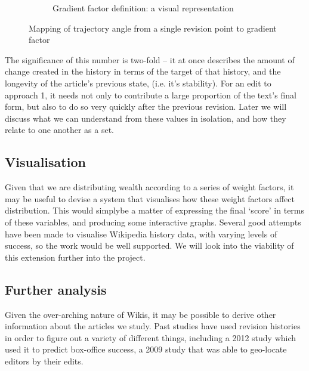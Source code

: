 \begin{figure}
\begin{subfigure}[b]{\linewidth}
    \caption{Gradient factor definition: a visual representation}
  \end{subfigure}
  \caption{Mapping of trajectory angle from a single revision point to
    gradient factor}
  \label{fig:circle-map}
\end{figure}

The significance of this number is two-fold -- it at once describes
the amount of change created in the history in terms of the target of
that history, and the longevity of the article's previous state,
(i.e. it's stability). For an edit to approach 1, it needs not only to
contribute a large proportion of the text's final form, but also to do
so very quickly after the previous revision. Later we will discuss
what we can understand from these values in isolation, and how they
relate to one another as a set. 

\subsection*{Visualisation}
Given that we are distributing wealth according to a series of weight
factors, it may be useful to devise a system that visualises how these
weight factors affect distribution. This would simplybe a matter of
expressing the final `score' in terms of these variables, and
producing some interactive graphs. Several good attempts have been
made to visualise Wikipedia history data, with varying levels of
success,\cite{Chi2008}\cite{Sabel2007}\cite{Suh2007}\cite{Wu2013}\cite{Viegas2004}
so the work would be well supported. We will look into the viability
of this extension further into the project.

\subsection*{Further analysis}
Given the over-arching nature of Wikis, it may be possible to derive
other information about the articles we study. Past studies have used
revision histories in order to figure out a variety of different
things, including a 2012 study which used it to predict box-office
success,\cite{Mestyan2012} a 2009 study that was able to geo-locate
editors by their edits.\cite{Lieberman2009}

